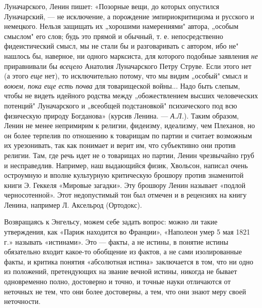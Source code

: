 Луначарского,  Ленин  пишет:  «Позорные  вещи,  до  которых  опустился
Луначарский,  ---  не  исключение, а  порождение  эмпириокритицизма  и
русского  и  немецкого.  Нельзя  защищать  их  „хорошими  намерениями"
автора, „особым  смыслом" его слов; будь  это прямой и обычный,  т. е.
непосредственно фидеистический смысл, мы не стали бы и разговаривать с
автором,  ибо  не" нашлось  бы,  наверное,  ни одного  марксиста,  для
которого подобные  заявления \emph{не} приравнивали  бы \emph{всецело}
Анатолия Луначарского Петру Струве. Если этого нет (а этого \emph{еще}
нет),  то  исключительно  потому,  что   мы  видим  „особый"  смысл  и
\emph{воюем,  пока  еще есть  почва}  для  товарищеской войны...  Надо
быть слепым,  чтобы не  видеть идейного родства  между „обожествлением
высших человеческих  потенций" Луначарского и  „всеобщей подстановкой"
психического под всю физическую природу Богданова» (курсив Ленина. ---
\emph{А.Л.}).  Таким образом,  Ленин  не менее  непримирим к  религии,
фидеизму, идеализму, чем Плеханов, но он более терпелив по отношению к
товарищам  по  партии и  считает  возможным  их урезонивать,  так  как
понимает и верит им, что субъективно они против религии. Там, где речь
идет не о товарищах но  партии, Ленин чрезвычайно груб и несправедлив.
Например,  наш выдающийся  физик, Хвольсон,  написал очень  остроумную
и  вполне  культурную  критическую  брошюру  против  знаменитой  книги
Э.  Геккеля  «Мировые загадки».  Эту  брошюру  Ленин называет  «подлой
черносотенной». Этот  недопустимый тон  был отмечен  и в  рецензиях на
книгу Ленина, например Л. Аксельрод (Ортодокс).

Возвращаясь  к Энгельсу,  можем  себе задать  вопрос:  можно ли  такие
утверждения, как  «Париж находится во  Франции», «Наполеон умер  5 мая
1821 г.»  называть «истинами». Это ---  факты, а не истины,  в понятие
истины  обязательно входит  какое-то обобщение  из фактов,  а не  сами
изолированные факты, и критика понятия «абсолютная истина» заключается
в том, что ни одно из положений, претендующих на звание вечной истины,
никогда не  бывает одновременно  полно, достоверно  и точно,  и точные
науки отличаются от неточных не тем,  что они более достоверны, а тем,
что они знают меру своей неточности.

